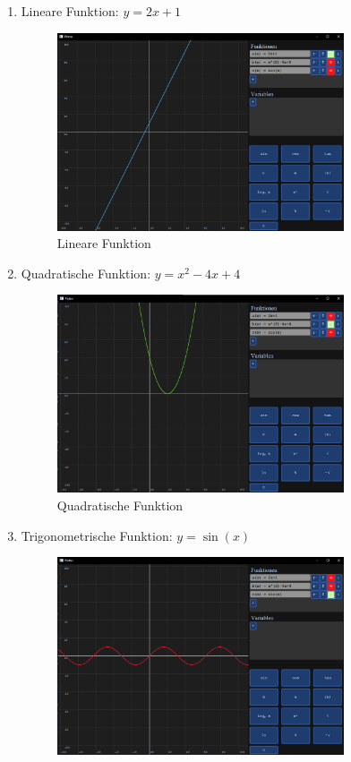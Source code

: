 \documentclass[a4paper]{article}
\begin{document}
\begin{enumerate}
	\item Lineare Funktion: \(y = 2x + 1\)
	      \begin{figure}[ht]
		      \centering
		      \includegraphics[width=0.8\textwidth]{Resources/example_linear.png}
		      \caption{Lineare Funktion}
		      \label{fig:example_linear}
	      \end{figure}
	      \newpage
	\item Quadratische Funktion: \(y = x^2 - 4x + 4\)
	      \begin{figure}[ht]
		      \centering
		      \includegraphics[width=0.8\textwidth]{Resources/example_quadratic.png}
		      \caption{Quadratische Funktion}
		      \label{fig:example_quadratic}
	      \end{figure}
	\item Trigonometrische Funktion: \(y = \sin(x)\)
	      \begin{figure}[ht]
		      \centering
		      \includegraphics[width=0.8\textwidth]{Resources/example_trigonometric.png}

\end{figure}
\end{enumerate}
\end{document}
